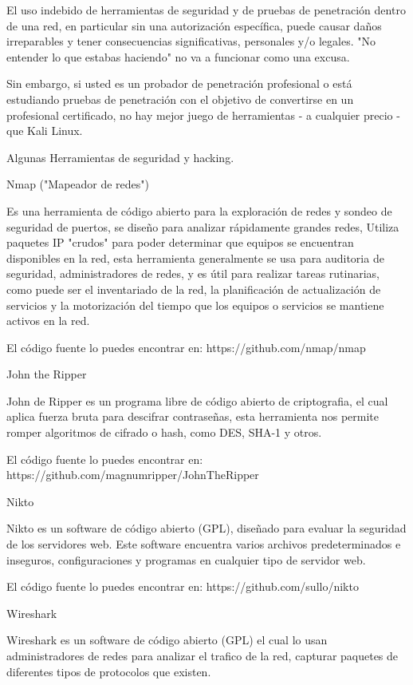 El uso indebido de herramientas de seguridad y de pruebas de penetración dentro de una red, en particular sin una autorización específica, puede causar daños irreparables y tener consecuencias significativas, personales y/o legales. "No entender lo que estabas haciendo" no va a funcionar como una excusa.

Sin embargo, si usted es un probador de penetración profesional o está estudiando pruebas de penetración con el objetivo de convertirse en un profesional certificado, no hay mejor juego de herramientas - a cualquier precio - que Kali Linux.

Algunas Herramientas de seguridad y hacking.

Nmap ("Mapeador de redes")

Es una herramienta de código abierto para la exploración de redes y sondeo de seguridad de puertos, se diseño para analizar rápidamente grandes redes, Utiliza paquetes IP "crudos" para poder determinar que equipos se encuentran disponibles en la red, esta herramienta generalmente se usa para auditoria de seguridad, administradores de redes, y es útil para realizar tareas rutinarias, como puede ser el inventariado de la red, la planificación de actualización de servicios y la motorización del tiempo que los equipos o servicios se mantiene activos en la red.

El código fuente lo puedes encontrar en: https://github.com/nmap/nmap

John the Ripper

John de Ripper es un programa libre de código abierto de criptografia, el cual aplica fuerza bruta para descifrar contraseñas, esta herramienta nos permite romper algoritmos de cifrado o hash, como DES, SHA-1 y otros.

El código fuente lo puedes encontrar en: https://github.com/magnumripper/JohnTheRipper

Nikto

Nikto es un software de código abierto (GPL), diseñado para evaluar la seguridad de los servidores web. Este software encuentra varios archivos predeterminados e inseguros, configuraciones y programas en cualquier tipo de servidor web.

El código fuente lo puedes encontrar en: https://github.com/sullo/nikto

Wireshark

Wireshark es un software de código abierto (GPL) el cual lo usan administradores de redes para analizar el trafico de la red, capturar paquetes de diferentes tipos de protocolos que existen.

